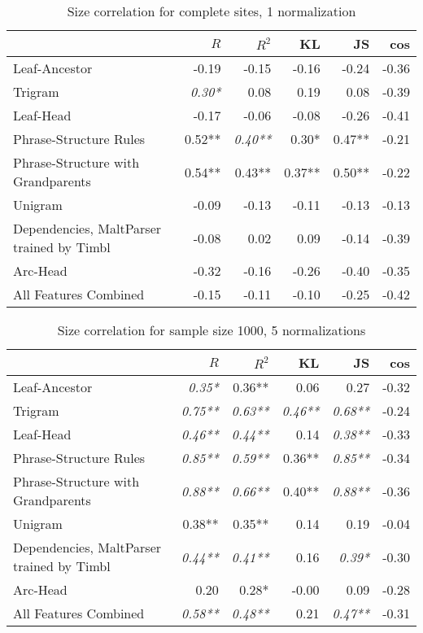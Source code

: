 \begin{table}
\begin{tabular}{l|rrrrr}
& $R$ & $R^2$ & KL & JS & cos  \\ \hline
  Leaf-Ancestor&-0.19 & -0.15 & -0.16 & -0.24 & -0.36\\
  Trigram&\textit{0.30*} & 0.08 & 0.19 & 0.08 & -0.39\\
  Leaf-Head&-0.17 & -0.06 & -0.08 & -0.26 & -0.41\\
  Phrase-Structure Rules&0.52** & \textit{0.40**} & 0.30* & 0.47** & -0.21\\
  Phrase-Structure with Grandparents&0.54** & 0.43** & 0.37** & 0.50** & -0.22\\
  Unigram&-0.09 & -0.13 & -0.11 & -0.13 & -0.13\\
  Dependencies, MaltParser trained by Timbl&-0.08 & 0.02 & 0.09 & -0.14 & -0.39\\
  Arc-Head&-0.32 & -0.16 & -0.26 & -0.40 & -0.35\\
  All Features Combined&-0.15 & -0.11 & -0.10 & -0.25 & -0.42\\
\end{tabular}
\caption{Size correlation for complete sites, 1 normalization}
\label{size-cor-1-full}
\end{table}

\begin{table}
\begin{tabular}{l|rrrrr}
& $R$ & $R^2$ & KL & JS & cos  \\ \hline
  Leaf-Ancestor&\textit{0.35*} & 0.36** & 0.06 & 0.27 & -0.32\\
  Trigram&\textit{0.75**} & \textit{0.63**} & \textit{0.46**} & \textit{0.68**} & -0.24\\
  Leaf-Head&\textit{0.46**} & \textit{0.44**} & 0.14 & \textit{0.38**} & -0.33\\
  Phrase-Structure Rules&\textit{0.85**} & \textit{0.59**} & 0.36** & \textit{0.85**} & -0.34\\
  Phrase-Structure with Grandparents&\textit{0.88**} & \textit{0.66**} & 0.40** & \textit{0.88**} & -0.36\\
  Unigram&0.38** & 0.35** & 0.14 & 0.19 & -0.04\\
  Dependencies, MaltParser trained by Timbl&\textit{0.44**} & \textit{0.41**} & 0.16 & \textit{0.39*} & -0.30\\
  Arc-Head&0.20 & 0.28* & -0.00 & 0.09 & -0.28\\
  All Features Combined&\textit{0.58**} & \textit{0.48**} & 0.21 & \textit{0.47**} & -0.31\\
\end{tabular}
 \caption{Size correlation for sample size 1000, 5 normalizations}
 \label{size-cor-5-1000}
\end{table}

